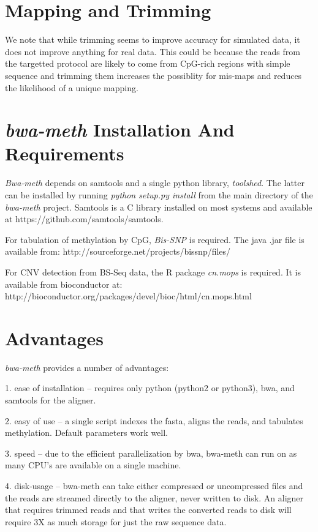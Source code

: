 \documentclass[12pt]{article}
\begin{document}
\section{Mapping and Trimming}
We note that while trimming seems to improve accuracy for simulated data,
it does not improve anything for real data. This could be because
the reads from the targetted protocol are likely to come from CpG-rich regions
with simple sequence and trimming them increases the possiblity for mis-maps
and reduces the likelihood of a unique mapping.

\section{\textit{bwa-meth} Installation And Requirements}

\textit{Bwa-meth} depends on samtools and a single python library, \textit{toolshed}.
The latter can be installed by running \emph{python setup.py install} from the main
directory of the \textit{bwa-meth} project. Samtools is a C library installed on most
systems and available at https://github.com/samtools/samtools.

For tabulation of methylation by CpG, \emph{Bis-SNP} \cite{bissnp} is required.
The java .jar file is available from: http://sourceforge.net/projects/bissnp/files/

For CNV detection from BS-Seq data, the R package \emph{cn.mops} \cite{cnmops} is required.
It is available
from bioconductor \cite{bioconductor} at: http://bioconductor.org/packages/devel/bioc/html/cn.mops.html

\section{Advantages}
\textit{bwa-meth} provides a number of advantages:

1. ease of installation -- requires only python (python2 or python3), bwa,
   and samtools for the aligner.

2. easy of use -- a single script indexes the fasta, aligns the reads, and
   tabulates methylation. Default parameters work well.

3. speed -- due to the efficient parallelization by bwa, bwa-meth can run on
   as many CPU's are available on a single machine.

4. disk-usage -- bwa-meth can take either compressed or uncompressed files
   and the reads are streamed directly to the aligner, never written to disk. An
   aligner that requires trimmed reads and that writes the converted reads to
   disk will require 3X as much storage for just the raw sequence data.
\end{document}
